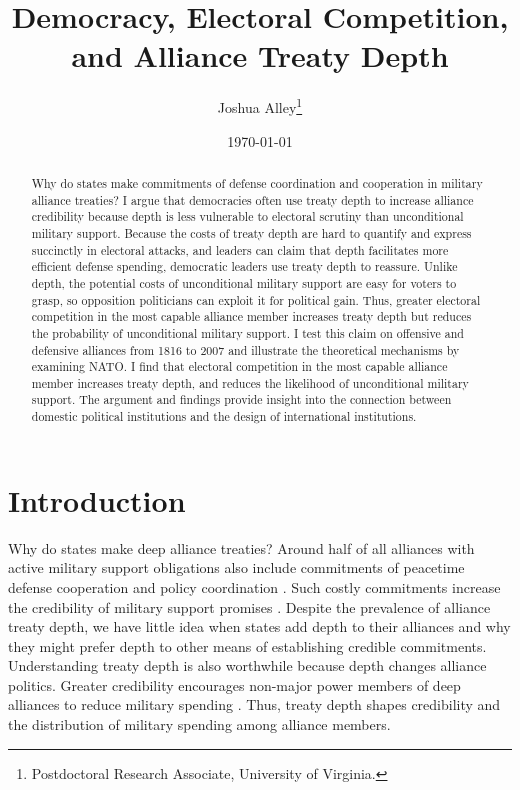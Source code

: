 \documentclass[12pt]{article}
\title{\textbf{Democracy, Electoral Competition, and Alliance Treaty Depth}}
\author{Joshua Alley\footnote{Postdoctoral Research Associate,
University of Virginia.}}
\date{\today}
\begin{document}
\maketitle 

\doublespace 

\begin{abstract}
Why do states make commitments of defense coordination and cooperation in military alliance treaties? 
I argue that democracies often use treaty depth to increase alliance credibility because depth is less vulnerable to electoral scrutiny than unconditional military support. 
Because the costs of treaty depth are hard to quantify and express succinctly in electoral attacks, and leaders can claim that depth facilitates more efficient defense spending, democratic leaders use treaty depth to reassure. 
Unlike depth, the potential costs of unconditional military support are easy for voters to grasp, so opposition politicians can exploit it for political gain. 
Thus, greater electoral competition in the most capable alliance member increases treaty depth but reduces the probability of unconditional military support. 
I test this claim on offensive and defensive alliances from 1816 to 2007 and illustrate the theoretical mechanisms by examining NATO. 
I find that electoral competition in the most capable alliance member increases treaty depth, and reduces the likelihood of unconditional military support. 
The argument and findings provide insight into the connection between domestic political institutions and the design of international institutions. 
\end{abstract}


\newpage 


\section{Introduction}


Why do states make deep alliance treaties? 
Around half of all alliances with active military support obligations also include commitments of peacetime defense cooperation and policy coordination \citep{Leedsetal2002}. 
Such costly commitments increase the credibility of military support promises \citep{Morrow1994}. 
Despite the prevalence of alliance treaty depth, we have little idea when states add depth to their alliances and why they might prefer depth to other means of establishing credible commitments.
Understanding treaty depth is also worthwhile because depth changes alliance politics. 
Greater credibility encourages non-major power members of deep alliances to reduce military spending \citep{Alley2020}.  
Thus, treaty depth shapes credibility and the distribution of military spending among alliance members. 
\end{document}
